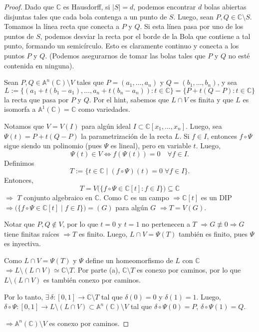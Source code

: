 \documentclass[12pt,a4paper]{article}
\theoremstyle{plain}
\newcommand{\A}{\mathbb{A}}
\newcommand{\C}{\mathbb{C}}
\begin{document}
\begin{proof}
	 Dado que $\C$ es Hausdorff, si $|S|=d$, podemos encontrar $d$ bolas abiertas disjuntas tales que cada bola contenga a un punto de $S$. Luego, sean $P,Q\in\C\setminus S$. Tomamos la línea recta que conecta a $P$ y $Q$. Si esta línea pasa por uno de los puntos de $S$, podemos desviar la recta por el borde de la Bola que contiene a tal punto, formando un semicírculo. Esto es claramente continuo y conecta a los puntos $P$ y $Q$. (Podemos asegurarnos de tomar las bolas tales que $P$ y $Q$ no esté contenida en ninguna).

	\bigskip
	 Sean $P,Q\in\A^n(\C)\setminus V$ tales que $P=(a_1,\ldots,a_n)$ y $Q=(b_1,\ldots,b_n)$, y sea
	\[
	  L:=\bigl\{(a_1+t(b_1-a_1),\ldots,a_n+t(b_n-a_n)):t\in\C\bigr\}=\{P+t(Q-P):t\in\C\}
	\]
	la recta que pasa por $P$ y $Q$. Por el hint, sabemos que $L\cap V$ es finita y que $L$ es isomorfa a $\A^1(\C)=\C$ como variedades.

	Notamos que $V=V(I)$ para algún ideal $I\subset\C[x_1,\ldots,x_n]$. Luego, sea $\Psi(t)=P+t(Q-P)$ la parametrización de la recta $L$. Si $f\in I$, entonces $f\circ\Psi$ sigue siendo un polinomio (pues $\Psi$ es lineal), pero en variable $t$. Luego,
	\[
	  \Psi(t)\in V \iff f(\Psi(t))=0\quad\forall f\in I.
	\]
	Definimos
	\[
	  T:=\{t\in\C\mid (f\circ\Psi)(t)=0\;\forall f\in I\}.
	\]
	Entonces,
	\[
	  T = V\bigl(\{f\circ\Psi\in\C[t]:f\in I\}\bigr)\subseteq\C
	\]
	$\Rightarrow$ $T$ conjunto algebraico en $\C$. Como $\C$ es un campo $\Rightarrow\C[t]$ es un DIP $\Rightarrow\bigl(\{f\circ\Psi\in\C[t]\mid f\in I\}\bigr)=(G)$ para algún $G$ $\Rightarrow T=V(G)$.

	Notar que $P,Q\notin V$, por lo que $t=0$ y $t=1$ no pertenecen a $T$ $\Rightarrow G\not\equiv 0\Rightarrow G$ tiene finitas raíces $\Rightarrow T$ es finito. Luego, $L\cap V=\Psi(T)$ también es finito, pues $\Psi$ es inyectiva.

	Como $L\cap V=\Psi(T)$ y $\Psi$ define un homeomorfismo de $L$ con $\C$ $\Rightarrow L\setminus(L\cap V)\simeq\C\setminus T$. Por parte (a), $\C\setminus T$ es conexo por caminos, por lo que $L\setminus(L\cap V)$ es también conexo por caminos.

	Por lo tanto, $\exists\,\delta:[0,1]\to\C\setminus T$ tal que $\delta(0)=0$ y $\delta(1)=1$. Luego, $\delta\circ\Psi:[0,1]\to L\setminus(L\cap V)\subset\A^n(\C)\setminus V$ tal que $\delta\circ\Psi(0)=P$, $\delta\circ\Psi(1)=Q$.

	$\Rightarrow\A^n(\C)\setminus V$ es conexo por caminos.
\end{proof}
\end{document}
